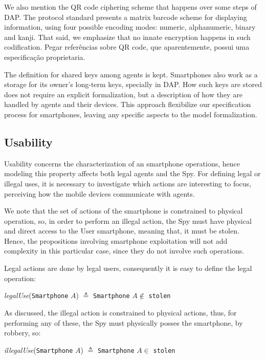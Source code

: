 We also mention the QR code ciphering scheme that happens over some steps of DAP. The protocol standard presents a matrix barcode scheme for displaying information, using four possible encoding modes: numeric, alphanumeric, binary and kanji. That said, we emphasize that no innate encryption happens in such codification. {\color{blue} Pegar referências sobre QR code, que aparentemente, possui uma especificação proprietaria}.

The definition for shared keys among agents is kept. Smartphones also work as a storage for its owner's long-term keys, specially in DAP. How such keys are stored does not require an explicit formalization, but a description of how they are handled by agents and their devices. This approach flexibilize our specification process for smartphones, leaving any specific aspects to the model formalization.





\subsection{Usability}
Usability concerns the characterization of an smartphone operations, hence modeling this property affects both legal agents and the Spy. For defining legal or illegal uses, it is necessary to investigate which actions are interesting to focus, perceiving how the mobile devices communicate with agents.

We note that the set of actions of the smartphone is constrained to physical operation, so, in order to perform an illegal action, the Spy must have physical and direct access to the User smartphone, meaning that, it must be stolen. Hence, the propositions involving smartphone exploitation will not add complexity in this particular case, since they do not involve such operations.

Legal actions are done by legal users, consequently it is easy to define the legal operation:
%
\begin{center}
  \textit{legalUse}(\texttt{Smartphone} $A$) $\triangleq$ \texttt{Smartphone} $A \notin$ \texttt{stolen}
\end{center}
%
As discussed, the illegal action is constrained to physical actions, thus, for performing any of these, the Spy must physically posses the smartphone, by robbery, so:
%
\begin{center}
  \textit{illegalUse}(\texttt{Smartphone} $A$) $\triangleq$ \texttt{Smartphone} $A \in$ \texttt{stolen}
\end{center}

